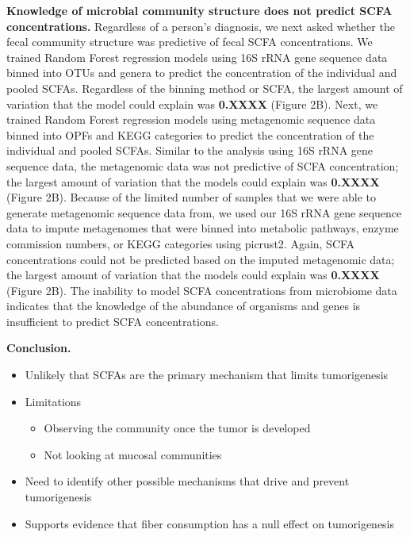 \documentclass[11pt,]{article}
\providecommand{\tightlist}{%
  \setlength{\itemsep}{0pt}\setlength{\parskip}{0pt}}
\begin{document}
\textbf{Knowledge of microbial community structure does not predict SCFA
concentrations.} Regardless of a person's diagnosis, we next asked
whether the fecal community structure was predictive of fecal SCFA
concentrations. We trained Random Forest regression models using 16S
rRNA gene sequence data binned into OTUs and genera to predict the
concentration of the individual and pooled SCFAs. Regardless of the
binning method or SCFA, the largest amount of variation that the model
could explain was \textbf{0.XXXX} (Figure 2B). Next, we trained Random
Forest regression models using metagenomic sequence data binned into
OPFs and KEGG categories to predict the concentration of the individual
and pooled SCFAs. Similar to the analysis using 16S rRNA gene sequence
data, the metagenomic data was not predictive of SCFA concentration; the
largest amount of variation that the models could explain was
\textbf{0.XXXX} (Figure 2B). Because of the limited number of samples
that we were able to generate metagenomic sequence data from, we used
our 16S rRNA gene sequence data to impute metagenomes that were binned
into metabolic pathways, enzyme commission numbers, or KEGG categories
using picrust2. Again, SCFA concentrations could not be predicted based
on the imputed metagenomic data; the largest amount of variation that
the models could explain was \textbf{0.XXXX} (Figure 2B). The inability
to model SCFA concentrations from microbiome data indicates that the
knowledge of the abundance of organisms and genes is insufficient to
predict SCFA concentrations.

\textbf{Conclusion.}

\begin{itemize}
\tightlist
\item
  Unlikely that SCFAs are the primary mechanism that limits
  tumorigenesis
\item
  Limitations

  \begin{itemize}
  \tightlist
  \item
    Observing the community once the tumor is developed
  \item
    Not looking at mucosal communities
  \end{itemize}
\item
  Need to identify other possible mechanisms that drive and prevent
  tumorigenesis
\item
  Supports evidence that fiber consumption has a null effect on
  tumorigenesis
\end{itemize}
\end{document}
